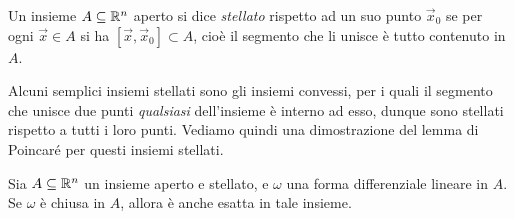 \begin{definizione} \label{d:insieme-stellato}
	Un insieme $A\subseteq\mathbb{R}^n$ aperto si dice \emph{stellato} rispetto ad un suo punto $\vec x_0$ se per ogni $\vec x\in A$ si ha $[\vec x,\vec x_0]\subset A$, cioè il segmento che li unisce è tutto contenuto in $A$.
\end{definizione}
Alcuni semplici insiemi stellati sono gli insiemi convessi, per i quali il segmento che unisce due punti \emph{qualsiasi} dell'insieme è interno ad esso, dunque sono stellati rispetto a tutti i loro punti.
Vediamo quindi una dimostrazione del lemma di Poincar\'e per questi insiemi stellati.
\begin{teorema} \label{t:poincare-stellato}
	Sia $A\subseteq\mathbb{R}^n$ un insieme aperto e stellato, e $\omega$ una forma differenziale lineare in $A$.
	Se $\omega$ è chiusa in $A$, allora è anche esatta in tale insieme.
\end{teorema}
